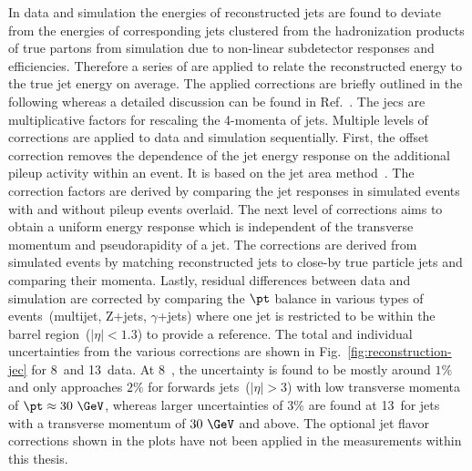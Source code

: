 In data and simulation the energies of reconstructed jets are found to deviate from the energies of corresponding jets clustered from the hadronization products of true partons from simulation due to non-linear subdetector responses and efficiencies. Therefore a series of  are applied to relate the reconstructed energy to the true jet energy on average. The applied corrections are briefly outlined in the following whereas a detailed discussion can be found in Ref.~\cite{Khachatryan:2016kdb}. The \glspl{jec} are multiplicative factors for rescaling the 4-momenta of jets. Multiple levels of corrections are applied to data and simulation sequentially. First, the offset correction removes the dependence of the jet energy response on the additional pileup activity within an event. It is based on the jet area method~\cite{Cacciari:2007fd}. The correction factors are derived by comparing the jet responses in simulated events with and without pileup events overlaid. The next level of corrections aims to obtain a uniform energy response which is independent of the transverse momentum and pseudorapidity of a jet. The corrections are derived from simulated events by matching reconstructed jets to close-by true particle jets and comparing their momenta. Lastly, residual differences between data and simulation are corrected by comparing the $\pt$ balance in various  types of events~(multijet, \mbox{$\mathrm{Z}$+jets}, \mbox{$\gamma$+jets}) where one jet is restricted to be within the barrel region~($|\eta|<1.3$) to provide a reference. The total and individual uncertainties from the various corrections are shown in Fig.~\ref{fig:reconstruction-jec} for 8~\TeV and 13~\TeV data. At 8~\TeV, the uncertainty is found to be mostly around $1\%$ and only approaches $2\%$ for forwards jets~($|\eta|>3$) with low transverse momenta of $\pt\approx30~\GeV$, whereas larger uncertainties of 3\% are found at 13~\TeV for jets with a transverse momentum of $30~\GeV$ and above. The optional jet flavor corrections shown in the plots have not been applied in the measurements within this thesis.

